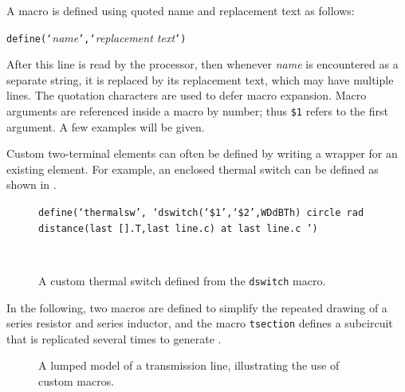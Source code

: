 A macro is defined using quoted name and replacement text as follows:

{\tt define(`}{\sl name}{\tt',`}{\sl replacement text}{\tt ')}

After this line is read by the \Mfour processor, then whenever {\sl name}
is encountered as a separate string, it is replaced by its replacement
text, which may have multiple lines.  The quotation characters are used
to defer macro expansion.  Macro arguments are referenced inside a
macro by number; thus {\tt \$1} refers to the first argument.
A few examples will be given.

Custom two-terminal elements can often be defined by writing a wrapper
for an existing element.  For example, an enclosed thermal switch
can be defined as shown in .
\begin{figure}[H]
   \parbox{5in}{\tt define(`thermalsw',\hfill\break
   \hbox{}\space`dswitch(`\$1',`\$2',WDdBTh)\hfill\break
   \hbox{}\space\space circle rad distance(last [].T,last line.c)
     at last line.c ') }%
   \hfill\raise-0.15in\hbox{ }
   \caption{A custom thermal switch defined from the {\tt dswitch} macro.}
   \label{Thermal}
   \end{figure}

\enlargethispage{\baselineskip}
In the following,
two macros are defined to simplify the repeated drawing
of a series resistor and series inductor, and the macro {\tt tsection} defines
a subcircuit that is replicated several times to generate .

{\small }
\begin{figure}[H]
   
   \caption{A lumped model of a transmission line, illustrating the
    use of custom macros.}
   \label{Tline}
   \end{figure}


